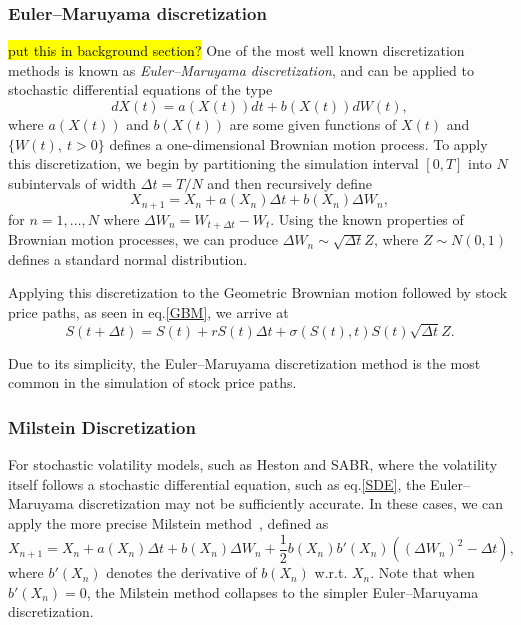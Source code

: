 \subsubsection{Euler–Maruyama discretization}
\hl{put this in background section?} One of the most well known discretization methods is known as \emph{Euler–Maruyama discretization}, and can be applied to stochastic differential equations of the type
\begin{equation}\label{SDE}
dX(t)=a(X(t))dt+b(X(t))dW(t),
\end{equation}
\noindent where $a(X(t))$ and $b(X(t))$ are some given functions of $X(t)$ and $\{W(t),\ t>0\}$ defines a one-dimensional Brownian motion process.
To apply this discretization, we begin by partitioning the simulation interval $[0,T]$ into $N$ subintervals of width $\Delta t=T/N$ and then recursively define
\begin{equation}
X_{n+1}=X_n+a(X_n)\Delta t+b(X_n)\Delta W_n,
\end{equation}
\noindent for $n=1,\ldots,N$ where $\Delta W_n=W_{t+\Delta t}-W_{t}$.
Using the known properties of Brownian motion processes, we can produce $\Delta W_n\sim \sqrt{\Delta t}Z$, where $Z\sim N(0,1)$ defines a standard normal distribution.

Applying this discretization to the Geometric Brownian motion followed by stock price paths, as seen in eq.\eqref{GBM}, we arrive at
\begin{equation}
S(t+\Delta t)=S(t)+rS(t)\Delta t+\sigma(S(t),t)S(t)\sqrt{\Delta t}Z.
\end{equation}

Due to its simplicity, the Euler–Maruyama discretization method is the most common in the simulation of stock price paths.


\subsubsection{Milstein Discretization}
For stochastic volatility models, such as Heston and SABR, where the volatility itself follows a stochastic differential equation, such as eq.\eqref{SDE}, the Euler–Maruyama discretization may not be sufficiently accurate. In these cases, we can apply the more precise Milstein method~\cite{Milstein}, defined as
\begin{equation}
X_{n+1}=X_n+a(X_n)\Delta t+b(X_n)\Delta W_n+\frac{1}{2}b(X_n)b'(X_n)((\Delta W_n)^2-\Delta t),
\end{equation}
\noindent where $b'(X_n)$ denotes the derivative of $b(X_n)$ w.r.t. $X_n$. Note that when $b'(X_n)=0$, the Milstein method collapses to the simpler Euler–Maruyama discretization.

